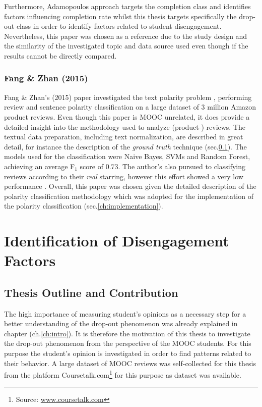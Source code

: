 \documentclass[
	a4paper,
	pdftex,
	12pt,	
	footinclude=true,
	fleqn,
	final,
	]{report}%
\begin{document}
Furthermore, Adamopoulos approach targets the completion class
and identifies factors influencing completion rate
whilst this thesis targets specifically the drop-out class in order 
to identify factors related to student disengagement.
Nevertheless, this paper was chosen as a reference due to the
study design and the similarity of the investigated 
topic and data source used even though if the results 
cannot be directly compared.

\vspace{-0.45cm}
\subsection{Fang \& Zhan (2015)}
\label{sec:fang}
\vspace{-0.3cm}

Fang \& Zhan's (2015) paper investigated the text polarity problem \cite{Fang2015}, 
performing review and sentence polarity classification on a large dataset of 3 million 
Amazon product reviews. Even though this paper is MOOC unrelated, it does provide a 
detailed insight into the methodology used to analyze (product-) reviews. 
The textual data preparation, including text normalization, are described in great detail, 
for instance the description of the \emph{ground truth} technique (sec.\ref{sec:fang}). 
The models used for the classification were Naive Bayes, SVMs and Random Forest, 
achieving an average F$_{1}$ score of $0.73$. The author's also pursued to classifying reviews 
according to their \emph{real} starring, however this effort showed a very low 
performance \cite{Fang2015}. Overall, this paper was chosen 
given the detailed description of the polarity classification methodology
which was adopted for the implementation of the polarity 
classification (sec.\ref{ch:implementation}).

\chapter{Identification of Disengagement Factors}
\label{ch:research}
\vspace{-0.6cm}

\vspace{-0.45cm}
\section{Thesis Outline and Contribution}
\label{sec:intro_contribution}
\vspace{-0.3cm}
The high importance of measuring student's opinions 
as a necessary step for a better understanding of the drop-out phenomenon
was already explained in chapter (ch.\ref{ch:intro}). 
It is therefore the motivation of this thesis to investigate the drop-out 
phenomenon from the perspective of the MOOC students. For this purpose 
the student's opinion is investigated in order to find patterns related
to their behavior. A large dataset of MOOC reviews was self-collected
for this thesis from the platform
Coursetalk.com\footnote{Source: \url{www.coursetalk.com}} for this 
purpose as dataset was available. 
\end{document}
